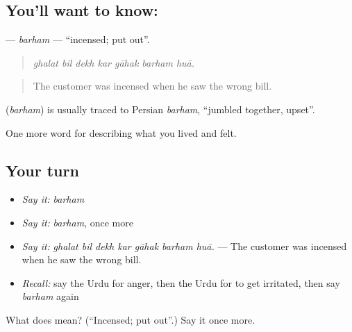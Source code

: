 \subsection*{You'll want to know: }
\textbf{} — \emph{barham} — \textquotedblleft{}incensed; put out\textquotedblright{}.

\begin{quote}
      
\end{quote}

\begin{quote}
\emph{ghalat bil dekh kar gāhak barham huā.}
\end{quote}

\begin{quote}
The customer was incensed when he saw the wrong bill.
\end{quote}

\begin{cousinweb}
\textbf{} (\emph{barham}) is usually traced to Persian \emph{barham}, \textquotedblleft{}jumbled together, upset\textquotedblright{}.
\end{cousinweb}

\begin{grammarlens}[title={What you've built}]
One more word for describing what you lived and felt.
\end{grammarlens}

\subsection*{Your turn}
\begin{itemize}
\raggedright
  \item \emph{Say it:} \emph{barham}
  \item \emph{Say it:} \emph{barham}, once more
  \item \emph{Say it:} \emph{ghalat bil dekh kar gāhak barham huā.} — The customer was incensed when he saw the wrong bill.
  \item \emph{Recall:} say the Urdu for anger, then the Urdu for to get irritated, then say \emph{barham} again
\end{itemize}

\begin{tcolorbox}[breakable,colback=teal!4,colframe=teal!35!black,title={Before you move on}]
What does  mean? (\textquotedblleft{}Incensed; put out\textquotedblright{}.) Say it once more.
\end{tcolorbox}
